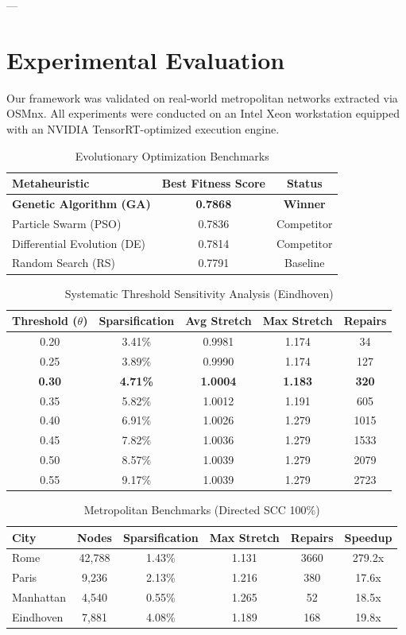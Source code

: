 \documentclass[journal]{IEEEtran}
\begin{document}
---

\section{Experimental Evaluation}
Our framework was validated on real-world metropolitan networks extracted via OSMnx. All experiments were conducted on an Intel Xeon workstation equipped with an NVIDIA TensorRT-optimized execution engine.

\begin{table}[h]
\centering
\caption{Evolutionary Optimization Benchmarks}
\begin{tabular}{lcc}
\toprule
Metaheuristic & Best Fitness Score & Status \\
\midrule
\textbf{Genetic Algorithm (GA)} & \textbf{0.7868} & \textbf{Winner} \\
Particle Swarm (PSO) & 0.7836 & Competitor \\
Differential Evolution (DE) & 0.7814 & Competitor \\
Random Search (RS) & 0.7791 & Baseline \\
\bottomrule
\end{tabular}
\label{tab:evolution}
\end{table}

\begin{table}[h]
\centering
\caption{Systematic Threshold Sensitivity Analysis (Eindhoven)}
\begin{tabular}{ccccc}
\toprule
Threshold ($\theta$) & Sparsification & Avg Stretch & Max Stretch & Repairs \\
\midrule
0.20 & 3.41\% & 0.9981 & 1.174 & 34 \\
0.25 & 3.89\% & 0.9990 & 1.174 & 127 \\
\textbf{0.30} & \textbf{4.71\%} & \textbf{1.0004} & \textbf{1.183} & \textbf{320} \\
0.35 & 5.82\% & 1.0012 & 1.191 & 605 \\
0.40 & 6.91\% & 1.0026 & 1.279 & 1015 \\
0.45 & 7.82\% & 1.0036 & 1.279 & 1533 \\
0.50 & 8.57\% & 1.0039 & 1.279 & 2079 \\
0.55 & 9.17\% & 1.0039 & 1.279 & 2723 \\
\bottomrule
\end{tabular}
\label{tab:sensitivity}
\end{table}

\begin{table}[h]
\centering
\caption{Metropolitan Benchmarks (Directed SCC 100\%)}
\begin{tabular}{lccccc}
\toprule
City & Nodes & Sparsification & Max Stretch & Repairs & Speedup \\
\midrule
Rome & 42,788 & 1.43\% & 1.131 & 3660 & 279.2x \\
Paris & 9,236 & 2.13\% & 1.216 & 380 & 17.6x \\
Manhattan & 4,540 & 0.55\% & 1.265 & 52 & 18.5x \\
Eindhoven & 7,881 & 4.08\% & 1.189 & 168 & 19.8x \\
\bottomrule
\end{tabular}
\label{tab:results}
\end{table}
\end{document}
